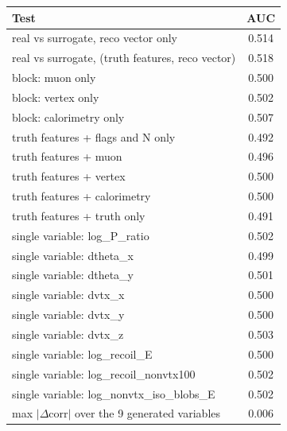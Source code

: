 \begin{tabular}{lc}
\toprule
Test & AUC \\
\midrule
real vs surrogate, reco vector only & 0.514 \\
real vs surrogate, (truth features, reco vector) & 0.518 \\
\midrule
block: muon only & 0.500 \\
block: vertex only & 0.502 \\
block: calorimetry only & 0.507 \\
truth features + flags and N only & 0.492 \\
truth features + muon & 0.496 \\
truth features + vertex & 0.500 \\
truth features + calorimetry & 0.500 \\
truth features + truth only & 0.491 \\
single variable: log\_P\_ratio & 0.502 \\
single variable: dtheta\_x & 0.499 \\
single variable: dtheta\_y & 0.501 \\
single variable: dvtx\_x & 0.500 \\
single variable: dvtx\_y & 0.500 \\
single variable: dvtx\_z & 0.503 \\
single variable: log\_recoil\_E & 0.500 \\
single variable: log\_recoil\_nonvtx100 & 0.502 \\
single variable: log\_nonvtx\_iso\_blobs\_E & 0.502 \\
\midrule
max $|\Delta$corr$|$ over the 9 generated variables & 0.006 \\
\bottomrule
\end{tabular}
